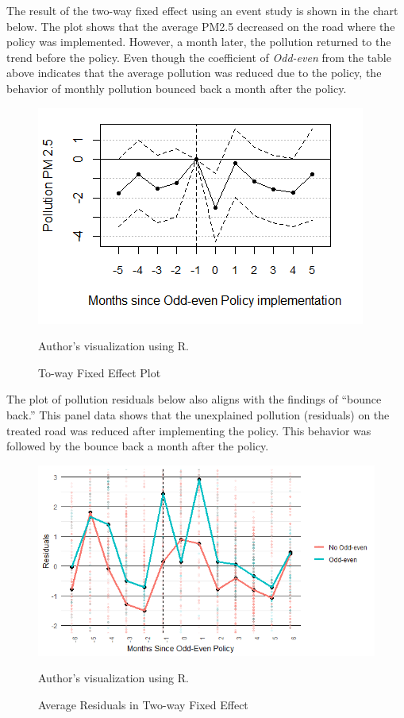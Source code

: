 \documentclass[AEJ]{AEA}
\begin{document}
The result of the two-way fixed effect using an event study is shown in the
chart below. The plot shows that the average PM2.5 decreased on the road
where the policy was implemented. However, a month later, the pollution
returned to the trend before the policy. Even though the coefficient of
\textit{Odd-even} from the table above indicates that the average pollution was
reduced due to the policy, the behavior of monthly pollution bounced
back a month after the policy.

\begin{figure}[hbt!]
    \centering
    \includegraphics[width=0.6\linewidth]{Graphs/Rplot.png}
    \caption{To-way Fixed Effect Plot}
    \label{fig:enter-label}
        \begin{figurenotes}[Source]
Author's visualization using R.
\end{figurenotes}
\end{figure}

The plot of pollution residuals below also aligns with the findings of
``bounce back.'' This panel data shows that the unexplained pollution
(residuals) on the treated road was reduced after implementing the policy. This behavior was followed by the bounce back a month after the policy.


\begin{figure}[hbt!]
    \centering
    \includegraphics[width=0.8\linewidth]{Graphs/Rplot01.png}
    \caption{Average Residuals in Two-way Fixed Effect}
    \label{fig:enter-label}
            \begin{figurenotes}[Source]
Author's visualization using R.
\end{figurenotes}
\end{figure}
\end{document}
